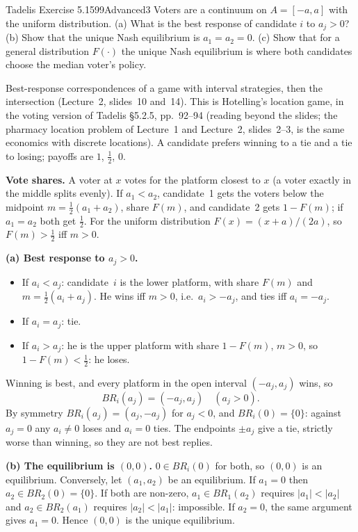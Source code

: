 \begin{exsol}{Tadelis Exercise 5.15}{99}{Advanced}{3}
\asked Voters are a continuum on $A = [-a, a]$ with the uniform distribution. (a) What is the best response of candidate $i$ to
$a_j > 0$? (b) Show that the unique Nash equilibrium is $a_1 = a_2 = 0$. (c) Show that for a general distribution $F(\cdot)$ the
unique Nash equilibrium is where both candidates choose the median voter's policy.

\method Best-response correspondences of a game with interval strategies, then the intersection (Lecture~2, slides~10 and~14).
This is Hotelling's location game, in the voting version of Tadelis \S5.2.5, pp.~92--94 (reading beyond the slides; the pharmacy
location problem of Lecture~1 and Lecture~2, slides~2--3, is the same economics with discrete locations). A candidate prefers winning to a tie and a tie to losing;
payoffs are $1$, $\tfrac12$, $0$.

\solution
\textbf{Vote shares.} A voter at $x$ votes for the platform closest to $x$ (a voter exactly in the middle splits evenly). If $a_1 < a_2$, candidate~1
gets the voters below the midpoint $m = \tfrac12(a_1 + a_2)$, share $F(m)$, and candidate~2 gets $1 - F(m)$; if $a_1 = a_2$ both get $\tfrac12$. For the
uniform distribution $F(x) = (x + a)/(2a)$, so $F(m) > \tfrac12$ iff $m > 0$.

\textbf{(a) Best response to $a_j > 0$.}
\begin{itemize}
  \item If $a_i < a_j$: candidate~$i$ is the lower platform, with share $F(m)$ and $m = \tfrac12(a_i + a_j)$. He wins iff $m > 0$, i.e.\ $a_i > -a_j$,
  and ties iff $a_i = -a_j$.
  \item If $a_i = a_j$: tie.
  \item If $a_i > a_j$: he is the upper platform with share $1 - F(m)$, $m > 0$, so $1 - F(m) < \tfrac12$: he loses.
\end{itemize}
Winning is best, and every platform in the open interval $(-a_j, a_j)$ wins, so
\[
  BR_i(a_j) = (-a_j, a_j) \quad (a_j > 0).
\]
By symmetry $BR_i(a_j) = (a_j, -a_j)$ for $a_j < 0$, and $BR_i(0) = \{0\}$: against $a_j = 0$ any $a_i \ne 0$ loses and $a_i = 0$ ties.
The endpoints $\pm a_j$ give a tie, strictly worse than winning, so they are not best replies.

\textbf{(b) The equilibrium is $(0,0)$.} $0 \in BR_i(0)$ for both, so $(0,0)$ is an equilibrium. Conversely, let $(a_1, a_2)$ be an
equilibrium. If $a_1 = 0$ then $a_2 \in BR_2(0) = \{0\}$. If both are non-zero, $a_1 \in BR_1(a_2)$ requires $|a_1| < |a_2|$ and
$a_2 \in BR_2(a_1)$ requires $|a_2| < |a_1|$: impossible. If $a_2 = 0$, the same argument gives $a_1 = 0$. Hence $(0,0)$ is the unique equilibrium.


\end{exsol}

